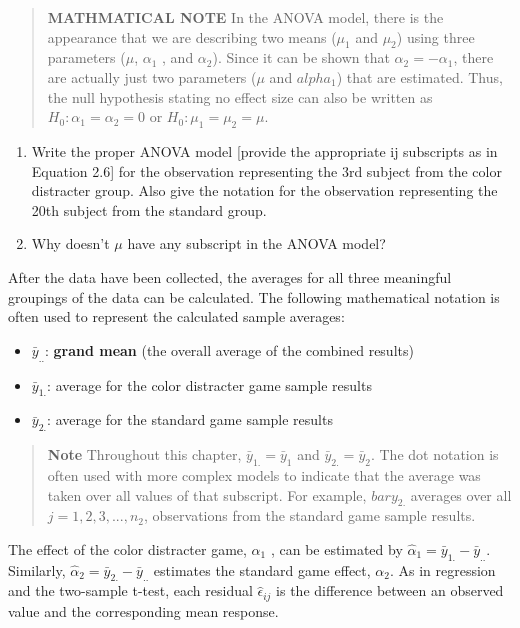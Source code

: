 \documentclass[
]{book}
\providecommand{\tightlist}{%
  \setlength{\itemsep}{0pt}\setlength{\parskip}{0pt}}
\begin{document}
\begin{quote}
\textbf{MATHMATICAL NOTE} In the ANOVA model, there is the appearance that we are describing two means (\(\mu_1\) and \(\mu_2\)) using three parameters (\(\mu\), \(\alpha_1\) , and \(\alpha_2\)). Since it can be shown that \(\alpha_2 = -\alpha_1\), there are actually just two parameters (\(\mu\) and \(alpha_1\)) that are estimated. Thus, the null hypothesis stating no effect size can also be written as \(H_0: \alpha_1 = \alpha_2 = 0\) or \(H_0: \mu_1 = \mu_2 = \mu\).
\end{quote}

\begin{enumerate}
\def\labelenumi{\arabic{enumi}.}
\setcounter{enumi}{16}
\item
  Write the proper ANOVA model {[}provide the appropriate ij subscripts as in Equation 2.6{]} for the observation representing the 3rd subject from the color distracter group. Also give the notation for the observation representing the 20th subject from the standard group.
\item
  Why doesn't \(\mu\) have any subscript in the ANOVA model?
\end{enumerate}

After the data have been collected, the averages for all three meaningful groupings of the data can be calculated. The following mathematical notation is often used to represent the calculated sample averages:

\begin{itemize}
\tightlist
\item
  \(\bar{y}_{..}\): \textbf{grand mean} (the overall average of the combined results)
\item
  \(\bar{y}_{1.}\): average for the color distracter game sample results
\item
  \(\bar{y}_{2.}\): average for the standard game sample results
\end{itemize}

\begin{quote}
\textbf{Note} Throughout this chapter, \(\bar{y}_{1.} = \bar{y}_{1}\) and \(\bar{y}_{2.} = \bar{y}_{2}\). The dot notation is often used with more complex models to indicate that the average was taken over all values of that subscript. For example, \(bar{y}_{2.}\) averages over all \(j = 1, 2, 3, ... , n_2\), observations from the standard game sample results.
\end{quote}

The effect of the color distracter game, \(\alpha_1\) , can be estimated by \(\hat{\alpha}_1 = \bar{y}_{1.} - \bar{y}_{..}\). Similarly, \(\hat{\alpha}_2 = \bar{y}_{2.} - \bar{y}_{..}\)
estimates the standard game effect, \(\alpha_2\). As in regression and the two-sample t-test, each residual \(\hat{\epsilon}_{ij}\) is the
difference between an observed value and the corresponding mean response.
\end{document}
